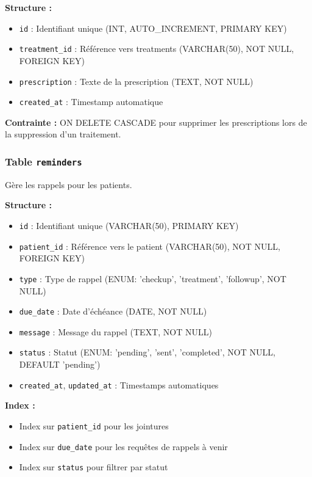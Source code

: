 \documentclass[12pt,a4paper]{report}
\begin{document}
\textbf{Structure :}
\begin{itemize}
    \item \texttt{id} : Identifiant unique (INT, AUTO\_INCREMENT, PRIMARY KEY)
    \item \texttt{treatment\_id} : Référence vers treatments (VARCHAR(50), NOT NULL, FOREIGN KEY)
    \item \texttt{prescription} : Texte de la prescription (TEXT, NOT NULL)
    \item \texttt{created\_at} : Timestamp automatique
\end{itemize}

\textbf{Contrainte :} ON DELETE CASCADE pour supprimer les prescriptions lors de la suppression d'un traitement.

\subsubsection{Table \texttt{reminders}}

Gère les rappels pour les patients.

\textbf{Structure :}
\begin{itemize}
    \item \texttt{id} : Identifiant unique (VARCHAR(50), PRIMARY KEY)
    \item \texttt{patient\_id} : Référence vers le patient (VARCHAR(50), NOT NULL, FOREIGN KEY)
    \item \texttt{type} : Type de rappel (ENUM: 'checkup', 'treatment', 'followup', NOT NULL)
    \item \texttt{due\_date} : Date d'échéance (DATE, NOT NULL)
    \item \texttt{message} : Message du rappel (TEXT, NOT NULL)
    \item \texttt{status} : Statut (ENUM: 'pending', 'sent', 'completed', NOT NULL, DEFAULT 'pending')
    \item \texttt{created\_at}, \texttt{updated\_at} : Timestamps automatiques
\end{itemize}

\textbf{Index :}
\begin{itemize}
    \item Index sur \texttt{patient\_id} pour les jointures
    \item Index sur \texttt{due\_date} pour les requêtes de rappels à venir
    \item Index sur \texttt{status} pour filtrer par statut
\end{itemize}
\end{document}

